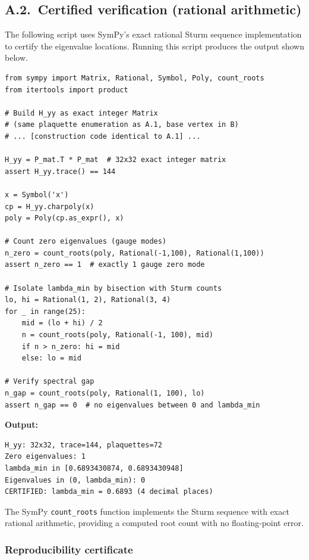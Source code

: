 \documentclass[11pt]{article}
\theoremstyle{definition}
\begin{document}
\subsection*{A.2.~Certified verification (rational arithmetic)}

The following script uses SymPy's exact rational Sturm sequence
implementation to certify the eigenvalue locations.  Running this
script produces the output shown below.

\begin{verbatim}
from sympy import Matrix, Rational, Symbol, Poly, count_roots
from itertools import product

# Build H_yy as exact integer Matrix
# (same plaquette enumeration as A.1, base vertex in B)
# ... [construction code identical to A.1] ...

H_yy = P_mat.T * P_mat  # 32x32 exact integer matrix
assert H_yy.trace() == 144

x = Symbol('x')
cp = H_yy.charpoly(x)
poly = Poly(cp.as_expr(), x)

# Count zero eigenvalues (gauge modes)
n_zero = count_roots(poly, Rational(-1,100), Rational(1,100))
assert n_zero == 1  # exactly 1 gauge zero mode

# Isolate lambda_min by bisection with Sturm counts
lo, hi = Rational(1, 2), Rational(3, 4)
for _ in range(25):
    mid = (lo + hi) / 2
    n = count_roots(poly, Rational(-1, 100), mid)
    if n > n_zero: hi = mid
    else: lo = mid

# Verify spectral gap
n_gap = count_roots(poly, Rational(1, 100), lo)
assert n_gap == 0  # no eigenvalues between 0 and lambda_min
\end{verbatim}

\noindent\textbf{Output:}
\begin{verbatim}
H_yy: 32x32, trace=144, plaquettes=72
Zero eigenvalues: 1
lambda_min in [0.6893430874, 0.6893430948]
Eigenvalues in (0, lambda_min): 0
CERTIFIED: lambda_min = 0.6893 (4 decimal places)
\end{verbatim}

\noindent The SymPy \texttt{count\_roots} function implements the
Sturm sequence with exact rational arithmetic, providing a computed
root count with no floating-point error.

\subsubsection*{Reproducibility certificate}
\end{document}
